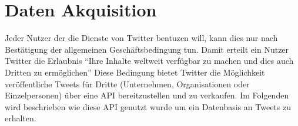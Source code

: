 \chapter{Daten Akquisition}
\label{chap:akquisition}
Jeder Nutzer der die Dienste von Twitter bentuzen will, kann dies nur nach Bestätigung der allgemeinen Geschäftsbedingung tun. Damit erteilt ein Nutzer Twitter die Erlaubnis "`Ihre Inhalte weltweit verfügbar zu machen und dies auch Dritten zu ermöglichen"'
Diese Bedingung bietet Twitter die Möglichkeit veröffentliche Tweets für Dritte (Unternehmen, Organisationen oder Einzelpersonen) über eine \ac{API} bereitzustellen und zu verkaufen. Im Folgenden wird beschrieben wie diese \ac{API} genutzt wurde um ein Datenbasis an Tweets zu erhalten.\\

